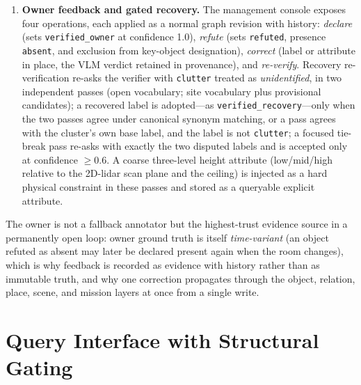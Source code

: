 \begin{enumerate}
line $>$0.6 with PCA minor extent $<$0.22~m and a horizontal minor axis), or
full-height wall band ($z$-span $>$2.5~m, per-meter-segment median thickness
$<$0.3~m, along-wall length $>$2~m---the length condition spares wall-mounted
panels). Flagged clusters are removed upstream of verification.
\item \textbf{Owner feedback and gated recovery.} The management console
exposes four operations, each applied as a normal graph revision with
history: \emph{declare} (sets \texttt{verified\_owner} at confidence 1.0),
\emph{refute} (sets \texttt{refuted}, presence \texttt{absent}, and exclusion
from key-object designation), \emph{correct} (label or attribute in place, the
VLM verdict retained in provenance), and \emph{re-verify}. Recovery
re-verification re-asks the verifier with \texttt{clutter} treated as
\emph{unidentified}, in two independent passes (open vocabulary; site
vocabulary plus provisional candidates); a recovered label is adopted---as
\texttt{verified\_recovery}---only when the two passes agree under canonical
synonym matching, or a pass agrees with the cluster's own base label, and the
label is not \texttt{clutter}; a focused tie-break pass re-asks with exactly
the two disputed labels and is accepted only at confidence $\ge$0.6. A coarse
three-level height attribute (low/mid/high relative to the 2D-lidar scan plane
and the ceiling) is injected as a hard physical constraint in these passes and
stored as a queryable explicit attribute.
\end{enumerate}

The owner is not a fallback annotator but the highest-trust evidence source in
a permanently open loop: owner ground truth is itself \emph{time-variant}
(an object refuted as absent may later be declared present again when the room
changes), which is why feedback is recorded as evidence with history rather
than as immutable truth, and why one correction propagates through the object,
relation, place, scene, and mission layers at once from a single write.

\section{Query Interface with Structural Gating}
\label{sec:query}

